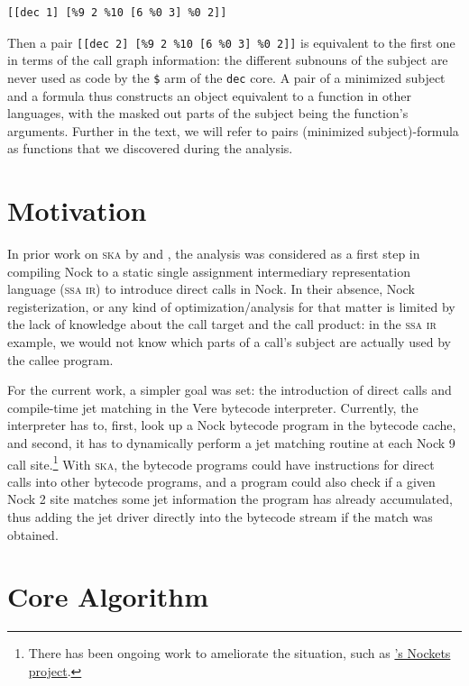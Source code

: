 \documentclass[twoside]{article}
\begin{document}
\begin{lstlisting}[style=listingblock]
[[dec 1] [%9 2 %10 [6 %0 3] %0 2]]
\end{lstlisting}

\noindent
Then a pair \lstinline[style=inlinecode]{[[dec 2] [%9 2 %10 [6 %0 3] %0 2]]} is equivalent to the first one in terms of the call graph information: the different subnouns of the subject are never used as code by the \lstinline[style=inlinecode]{$} arm of the \lstinline[style=inlinecode]{dec} core. A pair of a minimized subject and a formula thus constructs an object equivalent to a function in other languages, with the masked out parts of the subject being the function's arguments.  Further in the text, we will refer to pairs (minimized subject)-formula as functions that we discovered during the analysis.

\section{Motivation}

In prior work on \textsc{ska} by  and , the analysis was considered as a first step in compiling Nock to a static single assignment intermediary representation language (\textsc{ssa ir}) to introduce direct calls in Nock. In their absence, Nock registerization, or any kind of optimization/analysis for that matter is limited by the lack of knowledge about the call target and the call product: in the \textsc{ssa ir} example, we would not know which parts of a call's subject are actually used by the callee program.

\sloppy
For the current work, a simpler goal was set: the introduction of direct calls and compile-time jet matching in the Vere bytecode interpreter.  Currently, the interpreter has to, first, look up a Nock bytecode program in the bytecode cache, and second, it has to dynamically perform a jet matching routine at each Nock 9 call site.\footnote{There has been ongoing work to ameliorate the situation, such as \href{https://github.com/frodwith/nockets}{'s Nockets project}.}  With \textsc{ska}, the bytecode programs could have instructions for direct calls into other bytecode programs, and a program could also check if a given Nock 2 site matches some jet information the program has already accumulated, thus adding the jet driver directly into the bytecode stream if the match was obtained.

\section{Core Algorithm}
\end{document}

